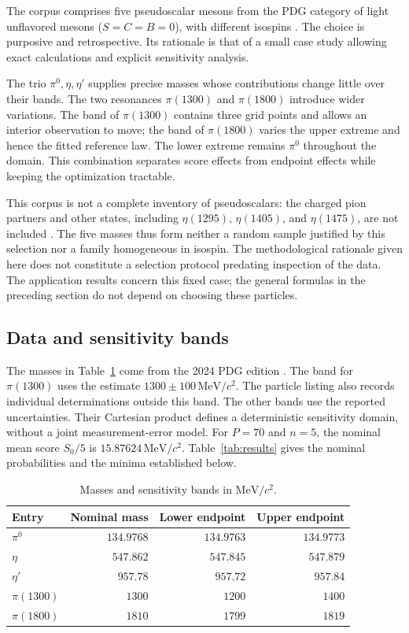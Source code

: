 \documentclass[11pt,a4paper]{article}
\newcommand{\unit}{\,\mathrm{MeV}/c^{2}}
\begin{document}
The corpus comprises five pseudoscalar mesons from the PDG category of light unflavored mesons ($S=C=B=0$), with different isospins \cite{pdg}. The choice is purposive and retrospective. Its rationale is that of a small case study allowing exact calculations and explicit sensitivity analysis.

The trio $\pi^0,\eta,\eta'$ supplies precise masses whose contributions change little over their bands. The two resonances $\pi(1300)$ and $\pi(1800)$ introduce wider variations. The band of $\pi(1300)$ contains three grid points and allows an interior observation to move; the band of $\pi(1800)$ varies the upper extreme and hence the fitted reference law. The lower extreme remains $\pi^0$ throughout the domain. This combination separates score effects from endpoint effects while keeping the optimization tractable.

This corpus is not a complete inventory of pseudoscalars: the charged pion partners and other states, including $\eta(1295)$, $\eta(1405)$, and $\eta(1475)$, are not included \cite{pdg}. The five masses thus form neither a random sample justified by this selection nor a family homogeneous in isospin. The methodological rationale given here does not constitute a selection protocol predating inspection of the data. The application results concern this fixed case; the general formulas in the preceding section do not depend on choosing these particles.

\subsection{Data and sensitivity bands}

The masses in Table~\ref{tab:data} come from the 2024 PDG edition \cite{pdg,pion}. The band for $\pi(1300)$ uses the estimate $1300\pm100\unit$. The particle listing also records individual determinations outside this band. The other bands use the reported uncertainties. Their Cartesian product defines a deterministic sensitivity domain, without a joint measurement-error model. For $P=70$ and $n=5$, the nominal mean score $S_0/5$ is $15.87624\unit$. Table~\ref{tab:results} gives the nominal probabilities and the minima established below.

\begin{table}[htbp]
\centering
\caption{Masses and sensitivity bands in $\mathrm{MeV}/c^2$.}
\label{tab:data}
\begin{tabular}{lrrr}
\toprule
Entry & Nominal mass & Lower endpoint & Upper endpoint\\
\midrule
$\pi^0$     & $134.9768$ & $134.9763$ & $134.9773$\\
$\eta$      & $547.862$  & $547.845$  & $547.879$\\
$\eta'$     & $957.78$   & $957.72$   & $957.84$\\
$\pi(1300)$ & $1300$     & $1200$     & $1400$\\
$\pi(1800)$ & $1810$     & $1799$     & $1819$\\
\bottomrule
\end{tabular}
\end{table}
\end{document}
